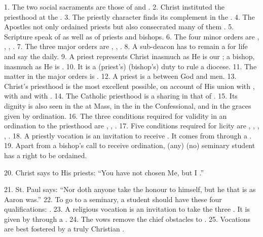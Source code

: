 \documentclass[a4paper,14pt]{memoir}
\newcommand\answer[1]{\textbf{\textit{#1}}}
\begin{document}
1. The two social sacraments are those of \answer{} and  \answer{}.  
2.  Christ
instituted the priesthood at the \answer{}. 
3. The priestly  character  finds
its complement in the \answer{}. 
4. The Apostles not  only  ordained  priests
but also consecrated many of them \answer{}. 
5. Scripture speak  of  \answer{}
as well as of priests and bishops. 
6. The four minor  orders  are  \answer{},
\answer{}, \answer{}, \answer{}.  
7.  The  three  major  orders  are  \answer{},
\answer{}, \answer{}. 
8. A sub-deacon has to remain a \answer{}  for  life  and
say the \answer{} daily. 
9. A priest represents Christ inasmuch as He is  our
\answer{}; a bishop, inasmuch as He is  \answer{}.  
10.  It  is  a  (priest's)
(bishop's) duty to rule a diocese. 
11. The matter in  the  major  orders  is
\answer{}. 
12. A priest is a \answer{}  between  God  and  men.  
13.  Christ's
priesthood is the most excellent possible, on  account  of  His  union  with
\answer{}, with \answer{} and with \answer{}. 
14. The Catholic priesthood is  a
sharing in that of \answer{}. 
15. Its dignity is also seen  in  the  \answer{}
at Mass, in the \answer{} in the Confessional, and  in  the  \answer{}  graces
given by ordination. 
16. The three conditions required for  validity  in  an
ordination to the priesthood are  \answer{},  \answer{},  \answer{}.  
17.  Five
conditions required for licity are \answer{}, \answer{},  \answer{},  \answer{},
\answer{}. 
18. A priestly vocation is an invitation to receive  \answer{}.  It
comes from \answer{} through a \answer{}. 
19. Apart from a  bishop's  call  to
receive ordination, (any) (no) seminary student has a right to be  ordained.

20. Christ says to His priests: ``You have not chosen Me,  but  I  \answer{}.''

21. St. Paul says: ``Nor doth anyone take the honour to himself, but he  that
is \answer{} as Aaron was.''
22. To go to a seminary, a  student  should  have
these four  qualifications:  \answer{}  \answer{}  \answer{}  \answer{}.  
23.  A
religious vocation is an invitation to take the three \answer{}. It is  given
by \answer{} through a \answer{}. 
24. The vows remove the chief  obstacles  to
\answer{}. 25. Vocations are best fostered by a truly Christian \answer{}.
\end{document}
